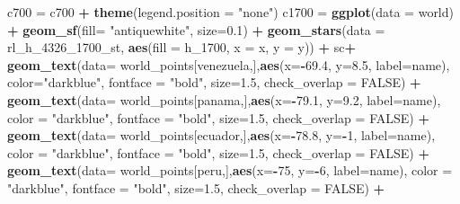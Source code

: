 \documentclass[12pt,twoside]{reedthesis}
\newenvironment{Shaded}{\begin{snugshade}}{\end{snugshade}}
\newcommand{\DataTypeTok}[1]{\textcolor[rgb]{0.13,0.29,0.53}{#1}}
\newcommand{\DecValTok}[1]{\textcolor[rgb]{0.00,0.00,0.81}{#1}}
\newcommand{\FloatTok}[1]{\textcolor[rgb]{0.00,0.00,0.81}{#1}}
\newcommand{\KeywordTok}[1]{\textcolor[rgb]{0.13,0.29,0.53}{\textbf{#1}}}
\newcommand{\NormalTok}[1]{#1}
\newcommand{\OperatorTok}[1]{\textcolor[rgb]{0.81,0.36,0.00}{\textbf{#1}}}
\newcommand{\OtherTok}[1]{\textcolor[rgb]{0.56,0.35,0.01}{#1}}
\newcommand{\StringTok}[1]{\textcolor[rgb]{0.31,0.60,0.02}{#1}}
\begin{document}
\begin{Shaded}
\begin{Highlighting}[]
\NormalTok{c700 =}\StringTok{ }\NormalTok{c700 }\OperatorTok{+}\StringTok{ }\KeywordTok{theme}\NormalTok{(}\DataTypeTok{legend.position =} \StringTok{"none"}\NormalTok{)}
\NormalTok{c1700 =}\StringTok{ }\KeywordTok{ggplot}\NormalTok{(}\DataTypeTok{data =}\NormalTok{ world) }\OperatorTok{+}\StringTok{ }
\StringTok{  }\KeywordTok{geom_sf}\NormalTok{(}\DataTypeTok{fill=} \StringTok{"antiquewhite"}\NormalTok{, }\DataTypeTok{size=}\FloatTok{0.1}\NormalTok{) }\OperatorTok{+}\StringTok{ }
\StringTok{  }\KeywordTok{geom_stars}\NormalTok{(}\DataTypeTok{data =}\NormalTok{ rl_h_}\DecValTok{4326}\NormalTok{_}\DecValTok{1700}\NormalTok{_st, }\KeywordTok{aes}\NormalTok{(}\DataTypeTok{fill =}\NormalTok{ h_}\DecValTok{1700}\NormalTok{, }\DataTypeTok{x =}\NormalTok{ x, }\DataTypeTok{y =}\NormalTok{ y)) }\OperatorTok{+}\StringTok{ }
\StringTok{  }\NormalTok{sc}\OperatorTok{+}
\StringTok{  }\KeywordTok{geom_text}\NormalTok{(}\DataTypeTok{data=}\NormalTok{ world_points[venezuela,],}\KeywordTok{aes}\NormalTok{(}\DataTypeTok{x=}\OperatorTok{-}\FloatTok{69.4}\NormalTok{, }\DataTypeTok{y=}\FloatTok{8.5}\NormalTok{, }\DataTypeTok{label=}\NormalTok{name), }\DataTypeTok{color=}\StringTok{"darkblue"}\NormalTok{, }\DataTypeTok{fontface =} \StringTok{"bold"}\NormalTok{, }\DataTypeTok{size=}\FloatTok{1.5}\NormalTok{, }\DataTypeTok{check_overlap =} \OtherTok{FALSE}\NormalTok{) }\OperatorTok{+}
\StringTok{  }\KeywordTok{geom_text}\NormalTok{(}\DataTypeTok{data=}\NormalTok{ world_points[panama,],}\KeywordTok{aes}\NormalTok{(}\DataTypeTok{x=}\OperatorTok{-}\FloatTok{79.1}\NormalTok{, }\DataTypeTok{y=}\FloatTok{9.2}\NormalTok{, }\DataTypeTok{label=}\NormalTok{name), }\DataTypeTok{color =} \StringTok{"darkblue"}\NormalTok{, }\DataTypeTok{fontface =} \StringTok{"bold"}\NormalTok{, }\DataTypeTok{size=}\FloatTok{1.5}\NormalTok{, }\DataTypeTok{check_overlap =} \OtherTok{FALSE}\NormalTok{) }\OperatorTok{+}\StringTok{ }
\StringTok{  }\KeywordTok{geom_text}\NormalTok{(}\DataTypeTok{data=}\NormalTok{ world_points[ecuador,],}\KeywordTok{aes}\NormalTok{(}\DataTypeTok{x=}\OperatorTok{-}\FloatTok{78.8}\NormalTok{, }\DataTypeTok{y=}\OperatorTok{-}\DecValTok{1}\NormalTok{, }\DataTypeTok{label=}\NormalTok{name), }\DataTypeTok{color =} \StringTok{"darkblue"}\NormalTok{, }\DataTypeTok{fontface =} \StringTok{"bold"}\NormalTok{, }\DataTypeTok{size=}\FloatTok{1.5}\NormalTok{, }\DataTypeTok{check_overlap =} \OtherTok{FALSE}\NormalTok{) }\OperatorTok{+}
\StringTok{  }\KeywordTok{geom_text}\NormalTok{(}\DataTypeTok{data=}\NormalTok{ world_points[peru,],}\KeywordTok{aes}\NormalTok{(}\DataTypeTok{x=}\OperatorTok{-}\DecValTok{75}\NormalTok{, }\DataTypeTok{y=}\OperatorTok{-}\DecValTok{6}\NormalTok{, }\DataTypeTok{label=}\NormalTok{name), }\DataTypeTok{color =} \StringTok{"darkblue"}\NormalTok{, }\DataTypeTok{fontface =} \StringTok{"bold"}\NormalTok{, }\DataTypeTok{size=}\FloatTok{1.5}\NormalTok{, }\DataTypeTok{check_overlap =} \OtherTok{FALSE}\NormalTok{) }\OperatorTok{+}

\end{Highlighting}
\end{Shaded}
\end{document}
